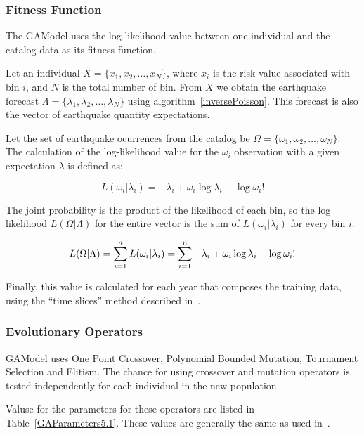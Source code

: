 \subsubsection*{Fitness Function}

The GAModel uses the log-likelihood value between one individual
and the catalog data as its fitness function.

Let an individual $X = \{x_1, x_2, \ldots, x_N\}$, where $x_i$ is the
risk value associated with bin $i$, and $N$ is the total number of
bin. From $X$ we obtain the earthquake forecast $\Lambda =
\{\lambda_1, \lambda_2, \ldots, \lambda_N\}$ using
algorithm~\ref{inversePoisson}. This forecast is also the vector of
earthquake quantity expectations.

Let the set of earthquake ocurrences from the catalog be $\Omega =
\{\omega_1, \omega_2, \ldots, \omega_N\}$. The calculation of the
log-likelihood value for the $\omega_i$ observation with a given
expectation $\lambda$ is defined as:

\begin{equation}
L(\omega_i|\lambda_i) = -\lambda_i + \omega_i\log\lambda_i - \log\omega_i!
\end{equation}

The joint probability is the product of the likelihood of each bin, so
the log likelihood $L(\Omega|\Lambda)$ for the entire vector is the
sum of $L(\omega_i|\lambda_i)$ for every bin $i$:

\begin{equation}
L(\Omega|\Lambda) = \sum_{i=1}^{n}L(\omega_i|\lambda_i) \\ =
\sum_{i=1}^{n} -\lambda_i + \omega_i\log\lambda_i - \log\omega_i!
\end{equation}

Finally, this value is calculated for each year that composes the
training data, using the ``time slices'' method described
in~\cite{ecta14}.


\subsubsection*{Evolutionary Operators}\label{gaOperators}

GAModel uses One Point Crossover, Polynomial Bounded Mutation,
Tournament Selection and Elitism. The chance for using crossover and
mutation operators is tested independently for each individual in the
new population.

Valuse for the parameters for these operators are listed in
Table~\ref{GAParameters5.1}. These values are generally the same as
used in~\cite{ecta14}.

